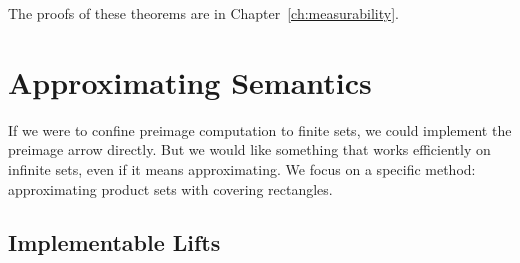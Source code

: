 The proofs of these theorems are in Chapter~\ref{ch:measurability}.



\section{Approximating Semantics}
\label{sec:approximating-semantics}

If we were to confine preimage computation to finite sets, we could implement the preimage arrow directly.
But we would like something that works efficiently on infinite sets, even if it means approximating.
We focus on a specific method: approximating product sets with covering rectangles.

\subsection{Implementable Lifts}

